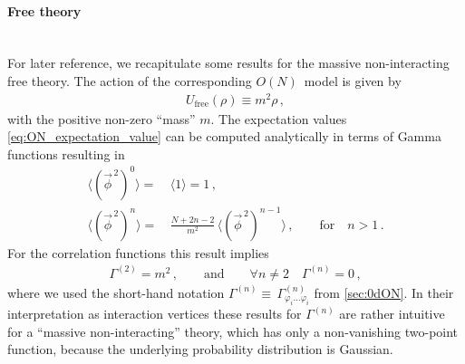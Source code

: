 \paragraph{Free theory}\label{paragraph:free_theory}\mbox{}\\%
For later reference, we recapitulate some results for the massive non-interacting free theory.
The action of the corresponding $O(N)$~model is given by
\begin{align}
	U_\mathrm{free} ( \rho ) \equiv m^2 \rho \, ,
\end{align}
with the positive non-zero ``mass'' $m$. 
The expectation values \eqref{eq:ON_expectation_value} can be computed analytically in terms of Gamma functions resulting in
\begin{align}
	\big\langle ( \vec{\phi}^{\, 2} )^0 \big\rangle = \, & \big\langle 1 \big\rangle = 1 \, ,	\\[.25em]
	\big\langle ( \vec{\phi}^{\, 2} )^n \big\rangle = \, & \frac{N + 2 n - 2}{m^2} \, \big\langle ( \vec{\phi}^{\, 2} )^{n-1} \big\rangle \, ,\qquad\text{for}\quad n > 1\, .
\end{align}
For the \ipi{} correlation functions this result implies
\begin{align}
	\Gamma^{(2)} = m^2 \, ,	\qquad\text{and}\qquad	\forall n \neq 2 \quad \Gamma^{(n)} = 0 \, ,	\label{eq:free_Gamma}
\end{align}
where we used the short-hand notation $\Gamma^{(n)} \equiv \, \Gamma^{(n)}_{\varphi_i \ldots \varphi_i}$ from \cref{sec:0dON}.
In their interpretation as interaction vertices these results for $\Gamma^{(n)}$ are rather intuitive for a ``massive non-interacting'' theory, which has only a non-vanishing \ipi{} two-point function, because the underlying probability distribution is Gaussian.

